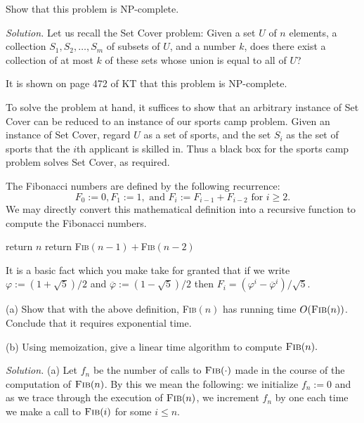 \documentclass[10pt,reqno]{amsart}
\begin{document}
\begin{outline}[enumerate]
Show that this problem is NP-complete.

\medskip
\noindent \emph{Solution.} Let us recall the Set Cover problem: Given a set $U$
of $n$ elements, a collection $S_1, S_2, \dots, S_m$ of subsets of $U$, and a
number $k$, does there exist a collection of at most $k$ of these sets whose
union is equal to all of $U$?

It is shown on page 472 of KT that this problem is NP-complete.

To solve the problem at hand, it suffices to show that an arbitrary instance of
Set Cover can be reduced to an instance of our sports camp problem. Given an
instance of Set Cover, regard $U$ as a set of sports, and the set $S_i$ as the
set of sports that the $i$th applicant is skilled in. Thus a black box for the
sports camp problem solves Set Cover, as required.

\medskip

\1 The Fibonacci numbers are defined by the following recurrence:
\[ F_0 := 0, F_1 := 1, \text{ and } F_i := F_{i-1}+F_{i-2} \text{ for } i \ge 2.
\]
We may directly convert this mathematical definition into a recursive function
to compute the Fibonacci numbers.

\medskip
\begin{algorithmic}[1]
    \State return $n$
    \EndIf
    \State return \textsc{Fib}$(n-1)+$\textsc{Fib}$(n-2)$
    \EndIf
    \EndProcedure
\end{algorithmic}
\medskip

It is a basic fact which you make take for granted that if we write $\varphi :=
(1+\sqrt{5})/2$ and $\overline{\varphi} := (1-\sqrt{5})/2$ then $F_i =
(\varphi^i - \overline{\varphi}^i)/\sqrt{5}$.

(a) Show that with the above definition, \textsc{Fib}$(n)$ has running time
$O(\text{\textsc{Fib}}(n))$. Conclude that it requires exponential time.

(b) Using memoization, give a linear time algorithm to compute
$\text{\textsc{Fib}}(n).$

\medskip
\noindent \emph{Solution.} (a) Let $f_n$ be the number of calls to
$\text{\textsc{Fib}}(\cdot)$ made in the course of the computation of
$\text{\textsc{Fib}}(n)$. By this we mean the following: we initialize $f_n:=0$
and as we trace through the execution of $\text{\textsc{Fib}}(n)$, we increment
$f_n$ by one each time we make a call to $\text{\textsc{Fib}}(i)$ for some $i
\le n$.


\end{outline}
\end{document}
